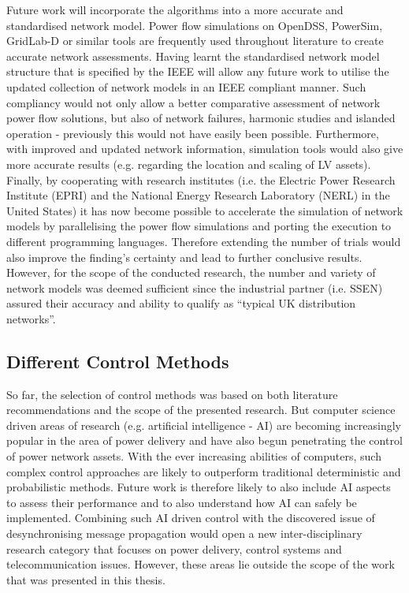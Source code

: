 Future work will incorporate the algorithms into a more accurate and standardised network model.
Power flow simulations on OpenDSS, PowerSim, GridLab-D or similar tools are frequently used throughout literature to create accurate network assessments.
Having learnt the standardised network model structure that is specified by the IEEE will allow any future work to utilise the updated collection of network models in an IEEE compliant manner.
Such compliancy would not only allow a better comparative assessment of network power flow solutions, but also of network failures, harmonic studies and islanded operation - previously this would not have easily been possible.
Furthermore, with improved and updated network information, simulation tools would also give more accurate results (e.g. regarding the location and scaling of LV assets).
Finally, by cooperating with research institutes (i.e. the Electric Power Research Institute (EPRI) and the National Energy Research Laboratory (NERL) in the United States) it has now become possible to accelerate the simulation of network models by parallelising the power flow simulations and porting the execution to different programming languages.
Therefore extending the number of trials would also improve the finding's certainty and lead to further conclusive results.
However, for the scope of the conducted research, the number and variety of network models was deemed sufficient since the industrial partner (i.e. SSEN) assured their accuracy and ability to qualify as ``typical UK distribution networks''.

\subsection{Different Control Methods}

So far, the selection of control methods was based on both literature recommendations and the scope of the presented research.
But computer science driven areas of research (e.g. artificial intelligence - AI) are becoming increasingly popular in the area of power delivery and have also begun penetrating the control of power network assets.
With the ever increasing abilities of computers, such complex control approaches are likely to outperform traditional deterministic and probabilistic methods.
Future work is therefore likely to also include AI aspects to assess their performance and to also understand how AI can safely be implemented.
Combining such AI driven control with the discovered issue of desynchronising message propagation would open a new inter-disciplinary research category that focuses on power delivery, control systems and telecommunication issues.
However, these areas lie outside the scope of the work that was presented in this thesis.

